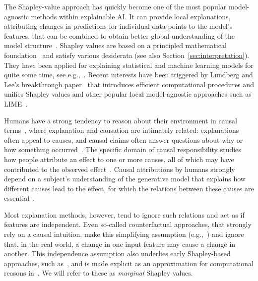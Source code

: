 \documentclass{article}
\begin{document}
The Shapley-value approach has quickly become one of the most popular model-agnostic methods within explainable AI. It can provide local explanations, attributing changes in predictions for individual data points to the model's features, that can be combined to obtain better global understanding of the model structure~\cite{lundberg2020local}. Shapley values are based on a principled mathematical foundation~\cite{shapley1953value} and satisfy various desiderata (see also Section~\ref{sec:interpretation}). They have been applied for explaining statistical and machine learning models for quite some time, see e.g.,~\cite{lipovetsky2001analysis,vstrumbelj2014explaining}. Recent interests have been triggered by Lundberg and Lee's breakthrough paper~\cite{lundberg2017unified} that introduces efficient computational procedures and unifies Shapley values and other popular local model-agnostic approaches such as LIME~\cite{ribeiro2016should}.

Humans have a strong tendency to reason about their environment in causal terms~\cite{sloman2005causal}, where explanation and causation are intimately related: explanations often appeal to causes, and causal claims often answer questions about why or how something occurred~\cite{lombrozo2017causal}. The specific domain of causal responsibility studies how people attribute an effect to one or more causes, all of which may have contributed to the observed effect~\cite{sober1988apportioning}. Causal attributions by humans strongly depend on a subject's understanding of the generative model that explains how different causes lead to the effect, for which the relations between these causes are essential~\cite{gerstenberg2012noisy}.

Most explanation methods, however, tend to ignore such relations and act as if features are independent. Even so-called counterfactual approaches, that strongly rely on a causal intuition, make this simplifying assumption (e.g.,~\cite{wachter2017counterfactual}) and ignore that, in the real world, a change in one input feature may cause a change in another. This independence assumption also underlies early Shapley-based approaches, such as~\cite{vstrumbelj2014explaining,datta2016algorithmic}, and is made explicit as an approximation for computational reasons in~\cite{lundberg2017unified}. We will refer to these as {\em marginal} Shapley values.
\end{document}
